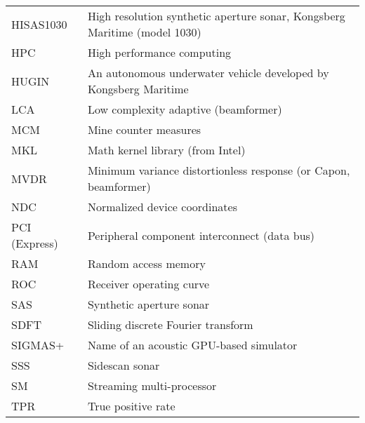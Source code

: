 \begin{longtable}{l l}
	HISAS1030        & High resolution synthetic aperture sonar, Kongsberg Maritime (model 1030) \\
	HPC              & High performance computing                                                \\
	HUGIN            & An autonomous underwater vehicle developed by Kongsberg Maritime          \\
	LCA              & Low complexity adaptive (beamformer)                                      \\
   MCM & Mine counter measures \\
	MKL              & Math kernel library (from Intel)                                          \\
	MVDR             & Minimum variance distortionless response (or Capon, beamformer)           \\
	NDC              & Normalized device coordinates                                             \\
	PCI (Express)    & Peripheral component interconnect (data bus)                              \\
	RAM              & Random access memory                                                      \\
	ROC              & Receiver operating curve                                                  \\
	SAS              & Synthetic aperture sonar                                                  \\
	SDFT             & Sliding discrete Fourier transform                                        \\
	SIGMAS+          & Name of an acoustic GPU-based simulator                                   \\
	SSS              & Sidescan sonar                                                            \\
	SM               & Streaming multi-processor \\
   TPR & True positive rate 
\end{longtable}






